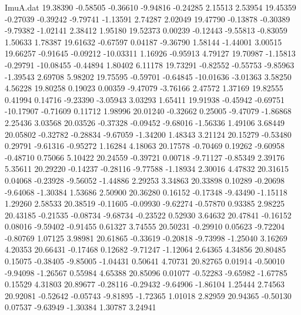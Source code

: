 \begin{filecontents}{ImuA.dat}
  19.38390   -0.58505   -0.36610   -9.94816   -0.24285    2.15513    2.53954
  19.45359   -0.27039   -0.39242   -9.79741   -1.13591    2.74287    2.02049
  19.47790   -0.13878   -0.30389   -9.79382   -1.02141    2.38412    1.95180
  19.52373    0.00239   -0.12443   -9.55813   -0.83059    1.50633    1.78387
  19.61632   -0.67597    0.04187   -9.36790    1.58144   -1.44001    3.00515
  19.66257   -0.91645   -0.09212  -10.03311    1.16926   -0.95913    4.79127
  19.70987   -1.15813   -0.29791  -10.08455   -0.44894    1.80402    6.11178
  19.73291   -0.82552   -0.55753   -9.85963   -1.39543    2.69708    5.98202
  19.75595   -0.59701   -0.64845  -10.01636   -3.01363    3.58250    4.56228
  19.80258    0.19023    0.00359   -9.47079   -3.76166    2.47572    1.37169
  19.82555    0.41994    0.14716   -9.23390   -3.05943    3.03293    1.65411
  19.91938   -0.45942   -0.69751  -10.17907   -0.71609    0.11712    1.98996
  20.01240   -0.32662    0.25005   -9.47079   -1.86868    2.25436    3.03568
  20.03526   -0.37328   -0.09452   -9.68016   -1.56336    1.49106    3.68449
  20.05802   -0.32782   -0.28834   -9.67059   -1.34200    1.48343    3.21124
  20.15279   -0.53480    0.29791   -9.61316   -0.95272    1.16284    4.18063
  20.17578   -0.70469    0.19262   -9.60958   -0.48710    0.75066    5.10422
  20.24559   -0.39721    0.00718   -9.71127   -0.85349    2.39176    5.35611
  20.29220   -0.14237   -0.28116   -9.77588   -1.18934    2.30016    4.47832
  20.31615    0.04068   -0.23928   -9.56052   -1.44886    2.29253    3.34863
  20.33898    0.10289   -0.20698   -9.64068   -1.30384    1.53686    2.50900
  20.36280    0.16152   -0.17348   -9.43490   -1.15118    1.29260    2.58533
  20.38519   -0.11605   -0.09930   -9.62274   -0.57870    0.93385    2.98225
  20.43185   -0.21535   -0.08734   -9.68734   -0.23522    0.52930    3.64632
  20.47841   -0.16152    0.08016   -9.59402   -0.91455    0.61327    3.74555
  20.50231   -0.29910    0.05623   -9.72204   -0.80769    1.07125    3.98981
  20.61865   -0.33619   -0.20818   -9.73998   -1.25040    3.16269    4.20353
  20.66431   -0.17468    0.12682   -9.71247   -1.12064    2.64365    4.34856
  20.80485    0.15075   -0.38405   -9.85005   -1.04431    0.50641    4.70731
  20.82765    0.01914   -0.50010   -9.94098   -1.26567    0.55984    4.65388
  20.85096    0.01077   -0.52283   -9.65982   -1.67785    0.15529    4.31803
  20.89677   -0.28116   -0.29432   -9.64906   -1.86104    1.25444    2.74563
  20.92081   -0.52642   -0.05743   -9.81895   -1.72365    1.01018    2.82959
  20.94365   -0.50130    0.07537   -9.63949   -1.30384    1.30787    3.24941

\end{filecontents}
